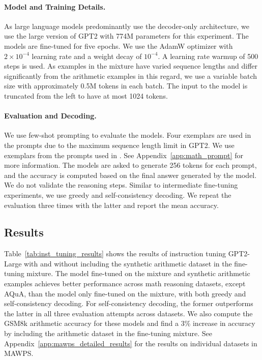 \paragraph{Model and Training Details.}
As large language models predominantly use the decoder-only architecture, we use the large version of GPT2 with 774M parameters for this experiment. The models are fine-tuned for five epochs. We use the AdamW optimizer with $2 \times 10^{-4}$ learning rate and a weight decay of $10^{-4}$. A learning rate warmup of 500 steps is used. As examples in the \tulu{} mixture have varied sequence lengths and differ significantly from the arithmetic examples in this regard, we use a variable batch size with approximately 0.5M tokens in each batch. The input to the model is truncated from the left to have at most 1024 tokens.

\paragraph{Evaluation and Decoding.}
We use few-shot prompting to evaluate the models. Four exemplars are used in the prompts due to the maximum sequence length limit in GPT2. We use exemplars from the prompts used in \citet{wei2022chain}. See Appendix~\ref{app:math_prompt} for more information. The models are asked to generate 256 tokens for each prompt, and the accuracy is computed based on the final answer generated by the model. We do not validate the reasoning steps. Similar to intermediate fine-tuning experiments, we use greedy and self-consistency decoding. We repeat the evaluation three times with the latter and report the mean accuracy.

\subsection{Results}
Table~\ref{tab:inst_tuning_results} shows the results of instruction tuning GPT2-Large with and without including the synthetic arithmetic dataset in the fine-tuning mixture. The model fine-tuned on the \tulu{} mixture and synthetic arithmetic examples achieves better performance across math reasoning datasets, except AQuA, than the model only fine-tuned on the \tulu{} mixture, with both greedy and self-consistency decoding. For self-consistency decoding, the former outperforms the latter in all three evaluation attempts across datasets. We also compute the GSM8k arithmetic accuracy for these models and find a 3\% increase in accuracy by including the arithmetic dataset in the fine-tuning mixture. See Appendix~\ref{app:mawps_detailed_results} for the results on individual datasets in MAWPS.

